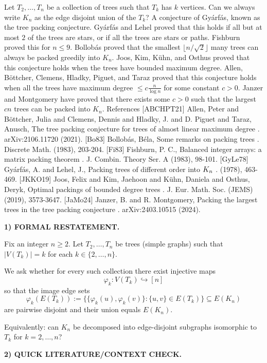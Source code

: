 Let $T_2,\ldots,T_n$ be a collection of trees such that $T_k$ has $k$ vertices. Can we always write $K_n$ as the edge disjoint union of the $T_k$? A conjecture of Gy\'{a}rf\'{a}s, known as the tree packing conjecture. Gy\'{a}rf\'{a}s and Lehel \cite{GyLe78} proved that this holds if all but at most $2$ of the trees are stars, or if all the trees are stars or paths. Fishburn \cite{Fi83} proved this for $n\leq 9$. Bollob\'{a}s \cite{Bo83} proved that the smallest $\lfloor n/\sqrt{2}\rfloor$ many trees can always be packed greedily into $K_n$. Joos, Kim, K\"{u}hn, and Osthus \cite{JKKO19} proved that this conjecture holds when the trees have bounded maximum degree. Allen, B\"{o}ttcher, Clemens, Hladky, Piguet, and Taraz \cite{ABCHPT21} proved that this conjecture holds when all the trees have maximum degree $\leq c\frac{n}{\log n}$ for some constant $c>0$. Janzer and Montgomery \cite{JaMo24} have proved that there exists some $c>0$ such that the largest $cn$ trees can be packed into $K_n$. References [ABCHPT21] Allen, Peter and B\"ottcher, Julia and Clemens, Dennis and Hladky, J. and D. Piguet and Taraz, Anusch, The tree packing conjecture for trees of almost linear maximum degree . arXiv:2106.11720 (2021). [Bo83] Bollob\'{a}s, B\'{e}la, Some remarks on packing trees . Discrete Math. (1983), 203-204. [Fi83] Fishburn, P. C., Balanced integer arrays: a matrix packing theorem . J. Combin. Theory Ser. A (1983), 98-101. [GyLe78] Gy\'{a}rf\'{a}s, A. and Lehel, J., Packing trees of different order into {$K\sb{n}$} . (1978), 463-469. [JKKO19] Joos, Felix and Kim, Jaehoon and K\"{u}hn, Daniela and Osthus, Deryk, Optimal packings of bounded degree trees . J. Eur. Math. Soc. (JEMS) (2019), 3573-3647. [JaMo24] Janzer, B. and R. Montgomery, Packing the largest trees in the tree packing conjecture . arXiv:2403.10515 (2024).


\noindent\textbf{1) FORMAL RESTATEMENT.}

Fix an integer $n\ge 2$. Let $T_2,\dots,T_n$ be trees (simple graphs) such that $|V(T_k)|=k$ for each $k\in\{2,\dots,n\}$.

We ask whether for every such collection there exist injective maps
\[\varphi_k:V(T_k)\hookrightarrow [n]\]
so that the image edge sets
\[\varphi_k(E(T_k)):=\{\{\varphi_k(u),\varphi_k(v)\}:\{u,v\}\in E(T_k)\}
\subseteq E(K_n)
\]
are pairwise disjoint and their union equals $E(K_n)$.

Equivalently: can $K_n$ be decomposed into edge-disjoint subgraphs isomorphic to $T_k$ for $k=2,\dots,n$?

\medskip
\noindent\textbf{2) QUICK LITERATURE/CONTEXT CHECK.}

